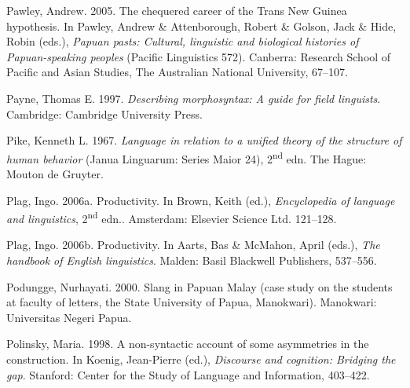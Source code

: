 \begin{styleCitaviBibliographyEntry}
Pawley, Andrew. 2005. The chequered career of the Trans New Guinea hypothesis. In Pawley, Andrew \& Attenborough, Robert \& Golson, Jack \& Hide, Robin (eds.), \textit{Papuan pasts: Cultural, linguistic and biological histories of Papuan-speaking peoples} (Pacific Linguistics 572). Canberra: Research School of Pacific and Asian Studies, The Australian National University, 67–107.
\end{styleCitaviBibliographyEntry}

\begin{styleCitaviBibliographyEntry}
Payne, Thomas E. 1997. \textit{Describing morphosyntax: A guide for field linguists}. Cambridge: Cambridge University Press.
\end{styleCitaviBibliographyEntry}

\begin{styleCitaviBibliographyEntry}
Pike, Kenneth L. 1967. \textit{Language in relation to a unified theory of the structure of human behavior} (Janua Linguarum: Series Maior 24), 2\textsuperscript{nd} edn. The Hague: Mouton de Gruyter.
\end{styleCitaviBibliographyEntry}

\begin{styleCitaviBibliographyEntry}
Plag, Ingo. 2006a. Productivity. In Brown, Keith (ed.), \textit{Encyclopedia of language and linguistics}, 2\textsuperscript{nd} edn.. Amsterdam: Elsevier Science Ltd. 121–128.
\end{styleCitaviBibliographyEntry}

\begin{styleCitaviBibliographyEntry}
Plag, Ingo. 2006b. Productivity. In Aarts, Bas \& McMahon, April (eds.), \textit{The handbook of English linguistics}. Malden: Basil Blackwell Publishers, 537–556.
\end{styleCitaviBibliographyEntry}

\begin{styleCitaviBibliographyEntry}
Podungge, Nurhayati. 2000. Slang in Papuan Malay (case study on the students at faculty of letters, the State University of Papua, Manokwari). Manokwari: Universitas Negeri Papua.
\end{styleCitaviBibliographyEntry}

\begin{styleCitaviBibliographyEntry}
Polinsky, Maria. 1998. A non-syntactic account of some asymmetries in the  construction. In Koenig, Jean-Pierre (ed.), \textit{Discourse and cognition: Bridging the gap}. Stanford: Center for the Study of Language and Information, 403–422.
\end{styleCitaviBibliographyEntry}

